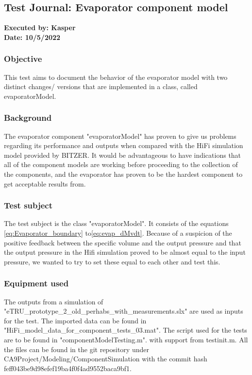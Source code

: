 \subsection{Test Journal: Evaporator component model} \label{app:tj_1}

\textbf{Executed by: Kasper} \\
\textbf{Date: 10/5/2022}

\subsubsection{Objective}
This test aims to document the behavior of the evaporator model with two distinct changes/ versions that are implemented in a class, called evaporatorModel. 

\subsubsection{Background}
The evaporator component "evaporatorModel" has proven to give us problems regarding its performance and outputs when compared with the HiFi simulation model provided by BITZER. 
It would be advantageous to have indications that all of the component models are working before proceeding to the collection of the components, and the evaporator has proven to be the hardest component to get acceptable results from.

\subsubsection{Test subject}
The test subject is the class "evaporatorModel". It consists of the equations \cref{eq:Evaporator_boundary} to\cref{eq:evap_dMvdt}.
Because of a suspicion of the positive feedback between the specific volume and the output pressure and that the output pressure in the Hifi simulation proved to be almost equal to the input pressure, we wanted to try to set these equal to each other and test this.   

\subsubsection{Equipment used}
The outputs from a simulation of "eTRU\_prototype\_2\_old\_perhabs\_with\_measurements.slx" are used as inputs for the test. The imported data can be found in "HiFi\_model\_data\_for\_component\_tests\_03.mat".
The script used for the tests are to be found in "componentModelTesting.m". with support from testinit.m.
All the files can be found in the git repository under CA9Project/Modeling/ComponentSimulation with the commit hash feff043be9d98efef19ba4f0f4ad9552baca9bf1.

